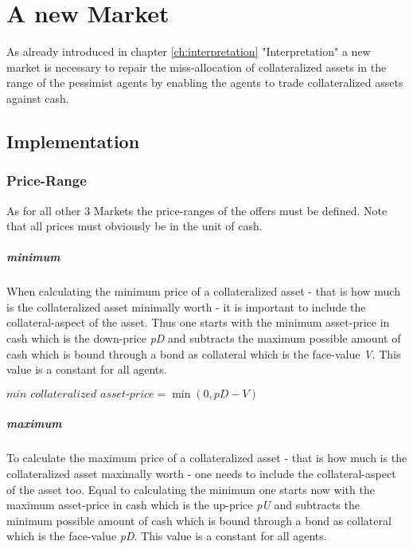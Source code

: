 \documentclass[Bachelorarbeit.tex]{subfiles}
\begin{document}
\graphicspath{{./figures/newMarket/}}	%

\chapter{A new Market}
As already introduced in chapter \ref{ch:interpretation} "Interpretation" a new market is necessary to repair the miss-allocation of collateralized assets in the range of the pessimist agents by enabling the agents to trade collateralized assets against cash.

\section{Implementation}

\subsection{Price-Range}
As for all other 3 Markets the price-ranges of the offers must be defined. Note that all prices must obviously be in the unit of cash.

\paragraph{minimum}
When calculating the minimum price of a collateralized asset - that is how much is the collateralized asset minimally worth - it is important to include the collateral-aspect of the asset. Thus one starts with the minimum asset-price in cash which is the down-price \textit{pD} and subtracts the maximum possible amount of cash which is bound through a bond as collateral which is the face-value \textit{V}. This value is a constant for all agents.

\begin{center}
$\textit{min collateralized asset-price} = \min(0, \textit{pD} - \textit{V})$
\end{center}
 
\paragraph{maximum}
To calculate the maximum price of a collateralized asset - that is how much is the collateralized asset maximally worth - one needs to include the collateral-aspect of the asset too. Equal to calculating the minimum one starts now with the maximum asset-price in cash which is the up-price \textit{pU} and subtracts the minimum possible amount of cash which is bound through a bond as collateral which is the face-value \textit{pD}. This value is a constant for all agents.
\end{document}
